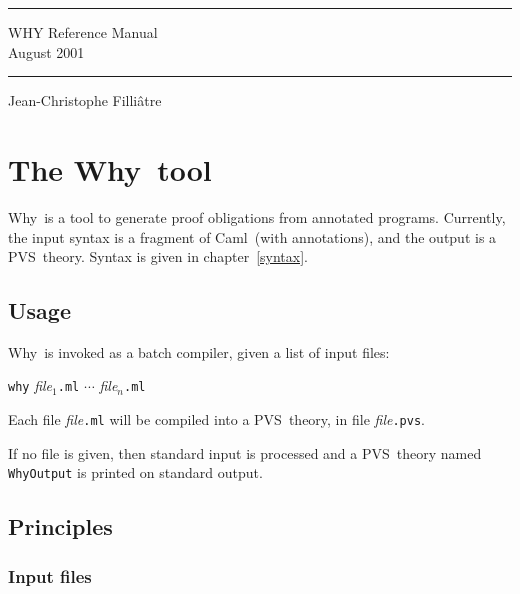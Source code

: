 \documentclass[a4paper,12pt]{report}
\newcommand{\caml}{\textsf{Caml}}
\newcommand{\pvs}{\textsf{PVS}}
\newcommand{\why}{\textsf{Why}}
\begin{document}
\thispagestyle{empty}
\begin{center}
\vfill
\rule\textwidth{0.1cm}\\[0.3cm]
{\Huge\sf WHY Reference Manual}\\[0.5cm]
{\large August 2001}\\
\rule\textwidth{0.1cm}
\vfill
\noindent Jean-Christophe Filli\^atre
\vfill
\end{center}

\tableofcontents

\chapter{The \why\ tool}

\why\ is a tool to generate proof obligations from annotated programs.
Currently, the input syntax is a fragment of \caml\ (with annotations),
and the output is a \pvs\ theory. Syntax is given in chapter~\ref{syntax}.


\section{Usage}

\why\ is invoked as a batch compiler, given a list of input files:
\begin{center}
  \texttt{why} \textit{file}$_1$\texttt{.ml} $\cdots$
    \textit{file}$_n$\texttt{.ml}
\end{center}
Each file \textit{file}\texttt{.ml} will be compiled into a \pvs\ theory,
in file \textit{file}\texttt{.pvs}.

If no file is given, then standard input is processed and a \pvs\ theory
named \texttt{WhyOutput} is printed on standard output.


\section{Principles}

\subsection{Input files}
\end{document}

